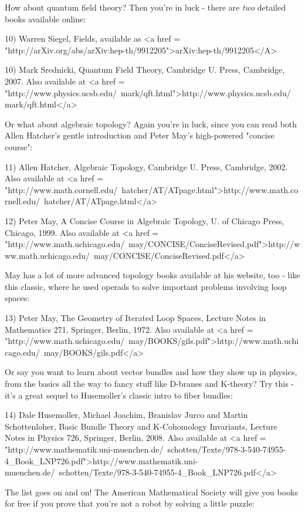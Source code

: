 How about quantum field theory?  Then you're in luck - there are 
\emph{two} detailed books available online:

10) Warren Siegel, Fields, available as <a href = "http://arXiv.org/abs/arXiv:hep-th/9912205">arXiv:hep-th/9912205</A>

10) Mark Srednicki, Quantum Field Theory, Cambridge U. Press, 
Cambridge, 2007.  Also available at 
<a href = "http://www.physics.ucsb.edu/~mark/qft.html">http://www.physics.ucsb.edu/~mark/qft.html</a>

Or what about algebraic topology?   Again you're in luck, since you 
can read both Allen Hatcher's gentle introduction and Peter May's 
high-powered "concise course":

11) Allen Hatcher, Algebraic Topology, Cambridge U. Press, Cambridge,
2002.  Also available at 
<a href = "http://www.math.cornell.edu/~hatcher/AT/ATpage.html">http://www.math.cornell.edu/~hatcher/AT/ATpage.html</a>

12) Peter May, A Concise Course in Algebraic Topology, U. of Chicago 
Press, Chicago, 1999.  Also available at 
<a href = "http://www.math.uchicago.edu/~may/CONCISE/ConciseRevised.pdf">http://www.math.uchicago.edu/~may/CONCISE/ConciseRevised.pdf</a>

May has a lot of more advanced topology books available at his website, 
too - like this classic, where he used operads to solve important 
problems involving loop spaces:

13) Peter May, The Geometry of Iterated Loop Spaces, Lecture Notes 
in Mathematics 271, Springer, Berlin, 1972.   Also available at 
<a href = "http://www.math.uchicago.edu/~may/BOOKS/gils.pdf">http://www.math.uchicago.edu/~may/BOOKS/gils.pdf</a>

Or say you want to learn about vector bundles and how they show up
in physics, from the basics all the way to fancy stuff like D-branes 
and K-theory?  Try this - it's a great sequel to Husemoller's classic
intro to fiber bundles:

14) Dale Husemoller, Michael Joachim, Branislav Jurco and Martin
Schottenloher, Basic Bundle Theory and K-Cohomology Invariants,
Lecture Notes in Physics 726, Springer, Berlin, 2008.  Also
available at 
<a href = "http://www.mathematik.uni-muenchen.de/~schotten/Texte/978-3-540-74955-4_Book_LNP726.pdf">http://www.mathematik.uni-muenchen.de/~schotten/Texte/978-3-540-74955-4_Book_LNP726.pdf</a>

The list goes on and on!  The American Mathematical Society will give 
you books for free if you prove that you're not a robot by solving a 
little puzzle:

